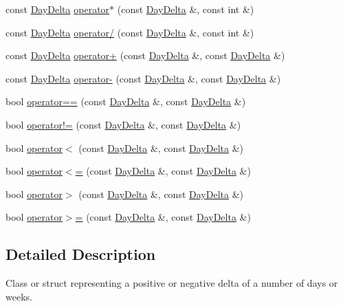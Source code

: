 \begin{DoxyCompactItemize}
\item 
const \hyperlink{structDayDelta}{\-Day\-Delta} \hyperlink{structDayDelta_ad744ce917d84eeb36a714a0743082a9e}{operator$\ast$} (const \hyperlink{structDayDelta}{\-Day\-Delta} \&, const int \&)
\item 
const \hyperlink{structDayDelta}{\-Day\-Delta} \hyperlink{structDayDelta_a78fe4e3a74d889ef0743b4fd1aee1481}{operator/} (const \hyperlink{structDayDelta}{\-Day\-Delta} \&, const int \&)
\item 
const \hyperlink{structDayDelta}{\-Day\-Delta} \hyperlink{structDayDelta_a281859b3e03b46be983288815761aa6b}{operator+} (const \hyperlink{structDayDelta}{\-Day\-Delta} \&, const \hyperlink{structDayDelta}{\-Day\-Delta} \&)
\item 
const \hyperlink{structDayDelta}{\-Day\-Delta} \hyperlink{structDayDelta_a33ace0bde4e898436bfd1bb430e09ca3}{operator-\/} (const \hyperlink{structDayDelta}{\-Day\-Delta} \&, const \hyperlink{structDayDelta}{\-Day\-Delta} \&)
\item 
bool \hyperlink{structDayDelta_afd3daebb578fdeba71f41dca9e485a71}{operator==} (const \hyperlink{structDayDelta}{\-Day\-Delta} \&, const \hyperlink{structDayDelta}{\-Day\-Delta} \&)
\item 
bool \hyperlink{structDayDelta_a84010ae193d86bdbd3eff7a719c86204}{operator!=} (const \hyperlink{structDayDelta}{\-Day\-Delta} \&, const \hyperlink{structDayDelta}{\-Day\-Delta} \&)
\item 
bool \hyperlink{structDayDelta_aa93123e48cb4ba1c40133fbce862143e}{operator$<$} (const \hyperlink{structDayDelta}{\-Day\-Delta} \&, const \hyperlink{structDayDelta}{\-Day\-Delta} \&)
\item 
bool \hyperlink{structDayDelta_af89fa21d1b6be6acb7d5ff574640d8f1}{operator$<$=} (const \hyperlink{structDayDelta}{\-Day\-Delta} \&, const \hyperlink{structDayDelta}{\-Day\-Delta} \&)
\item 
bool \hyperlink{structDayDelta_a8ea55528acf383ece24abc904204cf28}{operator$>$} (const \hyperlink{structDayDelta}{\-Day\-Delta} \&, const \hyperlink{structDayDelta}{\-Day\-Delta} \&)
\item 
bool \hyperlink{structDayDelta_a84d75c6dd0271ab2443667bee622847c}{operator$>$=} (const \hyperlink{structDayDelta}{\-Day\-Delta} \&, const \hyperlink{structDayDelta}{\-Day\-Delta} \&)
\end{DoxyCompactItemize}


\subsection{\-Detailed \-Description}
\-Class or struct representing a positive or negative delta of a number of days or weeks. 

